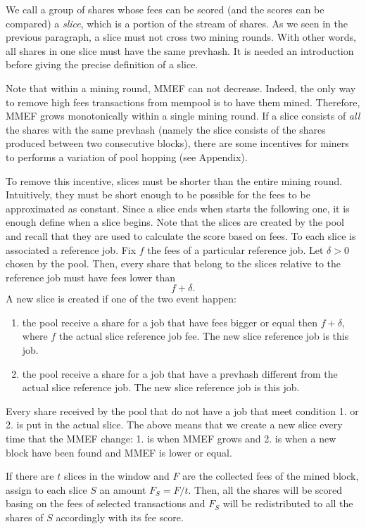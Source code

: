 \documentclass[11pt]{article}
\begin{document}
We call a group of shares whose fees can be scored (and the scores can be compared) a \emph{slice}, which is a portion of the stream of shares. As we seen in the previous paragraph, a slice must not cross two mining rounds. With other words, all shares in one slice must have the same prevhash. It is needed an introduction before giving the precise definition of a slice.

Note that within a mining round, MMEF can not decrease. Indeed,  the only way to remove high fees transactions from mempool is to have them mined. Therefore, MMEF grows monotonically within a single mining round. If a slice consists of \emph{all} the shares with the same prevhash (namely the slice consists of the shares produced between two consecutive blocks), there are some incentives for miners to performs a variation of pool hopping (see Appendix).

To remove this incentive, slices must be shorter than the entire mining round. Intuitively, they must be short enough to be possible for the fees to be approximated as constant. Since a slice ends when starts the following one, it is enough define when a slice begins. Note that the slices are created by the pool and recall that they are used to calculate the score based on fees. To each slice is associated a reference job. Fix $f$ the fees of a particular reference job. Let $\delta>0$ chosen by the pool. Then, every share that belong to the slices relative to the reference job must have fees lower than
\[ f+\delta.\]
A new slice is created if one of the two event happen:
\begin{enumerate}
	\item the pool receive a share for a job that have fees bigger or equal then $f+\delta$, where $f$ the actual slice reference job fee. The new slice reference job is this job.
	\item the pool receive a share for a job that have a prevhash different from the actual slice reference job. The new slice reference job is this job.
\end{enumerate}
Every share received by the pool that do not have a job that meet condition 1. or 2. is put in the actual slice. The above means that we create a new slice every time that the MMEF change: 1. is when MMEF grows and 2. is when a new block have been found and MMEF is lower or equal.

If there are $t$ slices in the window and $F$ are the collected fees of the mined block, assign to each slice $S$ an amount $F_S = F/t$. Then, all the shares will be scored basing on the fees of selected transactions and $F_S$ will be redistributed to all the shares of $S$ accordingly with its fee score.
\end{document}
